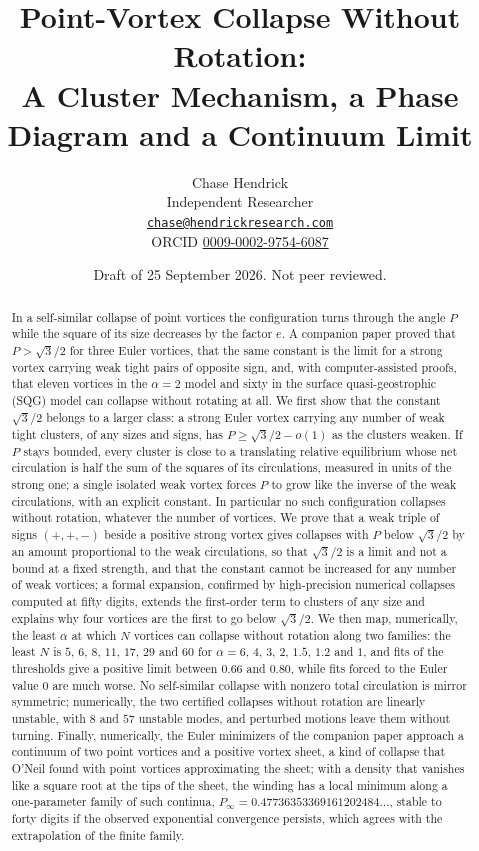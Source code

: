 \documentclass[11pt]{article}
\title{\Large\bfseries Point-Vortex Collapse Without Rotation:\\ A Cluster Mechanism, a Phase Diagram and a Continuum Limit}
\author{Chase Hendrick\\[0.2em] {\small Independent Researcher}\\ {\small\href{mailto:chase@hendrickresearch.com}{\texttt{chase@hendrickresearch.com}}}\\ {\small ORCID \href{https://orcid.org/0009-0002-9754-6087}{0009-0002-9754-6087}}}
\date{\small Draft of 25 September 2026. Not peer reviewed.}
\theoremstyle{definition}
\begin{document}
\maketitle

\begin{abstract}
In a self-similar collapse of point vortices the configuration turns through the angle $P$ while the square of its size decreases by the factor $e$. A companion paper proved that $P > \sqrt{3}/2$ for three Euler vortices, that the same constant is the limit for a strong vortex carrying weak tight pairs of opposite sign, and, with computer-assisted proofs, that eleven vortices in the $\alpha = 2$ model and sixty in the surface quasi-geostrophic (SQG) model can collapse without rotating at all. We first show that the constant $\sqrt{3}/2$ belongs to a larger class: a strong Euler vortex carrying any number of weak tight clusters, of any sizes and signs, has $P \ge \sqrt{3}/2 - o(1)$ as the clusters weaken. If $P$ stays bounded, every cluster is close to a translating relative equilibrium whose net circulation is half the sum of the squares of its circulations, measured in units of the strong one; a single isolated weak vortex forces $P$ to grow like the inverse of the weak circulations, with an explicit constant. In particular no such configuration collapses without rotation, whatever the number of vortices. We prove that a weak triple of signs $(+,+,-)$ beside a positive strong vortex gives collapses with $P$ below $\sqrt{3}/2$ by an amount proportional to the weak circulations, so that $\sqrt{3}/2$ is a limit and not a bound at a fixed strength, and that the constant cannot be increased for any number of weak vortices; a formal expansion, confirmed by high-precision numerical collapses computed at fifty digits, extends the first-order term to clusters of any size and explains why four vortices are the first to go below $\sqrt{3}/2$. We then map, numerically, the least $\alpha$ at which $N$ vortices can collapse without rotation along two families: the least $N$ is $5$, $6$, $8$, $11$, $17$, $29$ and $60$ for $\alpha = 6$, $4$, $3$, $2$, $1.5$, $1.2$ and $1$, and fits of the thresholds give a positive limit between $0.66$ and $0.80$, while fits forced to the Euler value $0$ are much worse. No self-similar collapse with nonzero total circulation is mirror symmetric; numerically, the two certified collapses without rotation are linearly unstable, with $8$ and $57$ unstable modes, and perturbed motions leave them without turning. Finally, numerically, the Euler minimizers of the companion paper approach a continuum of two point vortices and a positive vortex sheet, a kind of collapse that O'Neil found with point vortices approximating the sheet; with a density that vanishes like a square root at the tips of the sheet, the winding has a local minimum along a one-parameter family of such continua, $P_\infty = 0.47736353369161202484\ldots$, stable to forty digits if the observed exponential convergence persists, which agrees with the extrapolation of the finite family.


\end{abstract}
\end{document}
